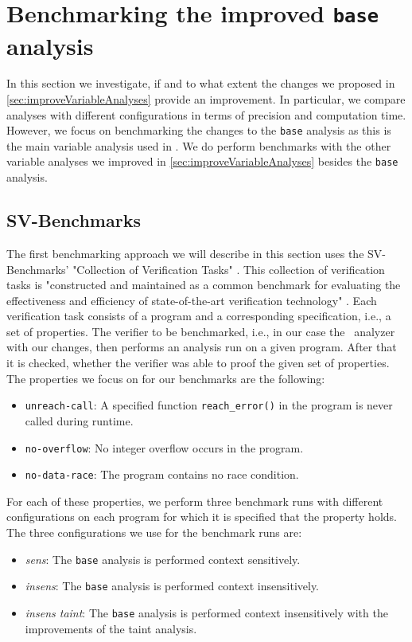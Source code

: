   \section{Benchmarking the improved \texttt{base} analysis}
    In this section we investigate, if and to what extent the changes we proposed in \autoref{sec:improveVariableAnalyses} provide an improvement. In particular, we compare analyses with different configurations in terms of precision and computation time. However, we focus on benchmarking the changes to the \texttt{base} analysis as this is the main variable analysis used in \gob. We do perform benchmarks with the other variable analyses we improved in \autoref{sec:improveVariableAnalyses} besides the \texttt{base} analysis.
    \subsection{SV-Benchmarks}\label{sec:benchSVbench}
      The first benchmarking approach we will describe in this section uses the SV-Benchmarks' "Collection of Verification Tasks" \parencite{svBench}. This collection of verification tasks is "constructed and maintained as a common benchmark for evaluating the effectiveness and efficiency of state-of-the-art verification technology" \parencite{svBench}. Each verification task consists of a program and a corresponding specification, i.e., a set of properties. The verifier to be benchmarked, i.e., in our case the \gob\ analyzer with our changes, then performs an analysis run on a given program. After that it is checked, whether the verifier was able to proof the given set of properties. The properties we focus on for our benchmarks are the following:
      \begin{itemize}
        \item \texttt{unreach-call}: A specified function \texttt{reach\_error()} in the program is never called during runtime.
        \item \texttt{no-overflow}: No integer overflow occurs in the program.
        \item \texttt{no-data-race}: The program contains no race condition.
      \end{itemize}
      For each of these properties, we perform three benchmark runs with different configurations on each program for which it is specified that the property holds.
      The three configurations we use for the benchmark runs are:
      \begin{itemize}
        \item \textit{sens}: The \texttt{base} analysis is performed context sensitively.
        \item \textit{insens}: The \texttt{base} analysis is performed context insensitively.
        \item \textit{insens taint}: The \texttt{base} analysis is performed context insensitively with the improvements of the taint analysis.
      \end{itemize}
